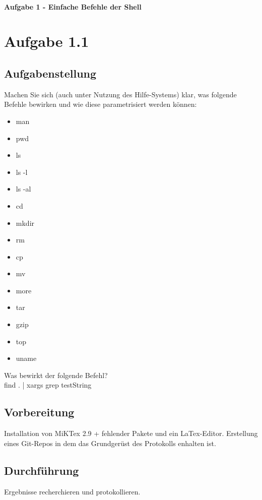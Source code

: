 \newpage

\paragraph{\LARGE Aufgabe 1 - Einfache Befehle der Shell}

\section{Aufgabe 1.1}
	\subsection{Aufgabenstellung}
		Machen Sie sich (auch unter Nutzung des Hilfe-Systems) klar, was folgende Befehle bewirken und wie diese parametrisiert werden k\"onnen:
		\begin{itemize}
			\item man
			\item pwd
			\item ls
			\item ls -l
			\item ls -al
			\item cd
			\item mkdir
			\item rm
			\item cp
			\item mv
			\item more
			\item tar
			\item gzip
			\item top
			\item uname
		\end{itemize}
		Was bewirkt der folgende Befehl?\\
		find . | xargs grep testString
		\newpage
	\subsection{Vorbereitung}
		Installation von MiKTex 2.9 + fehlender Pakete und ein LaTex-Editor. Erstellung eines Git-Repos in dem das Grundger\"ust des Protokolls enhalten ist.
	\subsection{Durchführung}
		Ergebnisse recherchieren und protokollieren.
